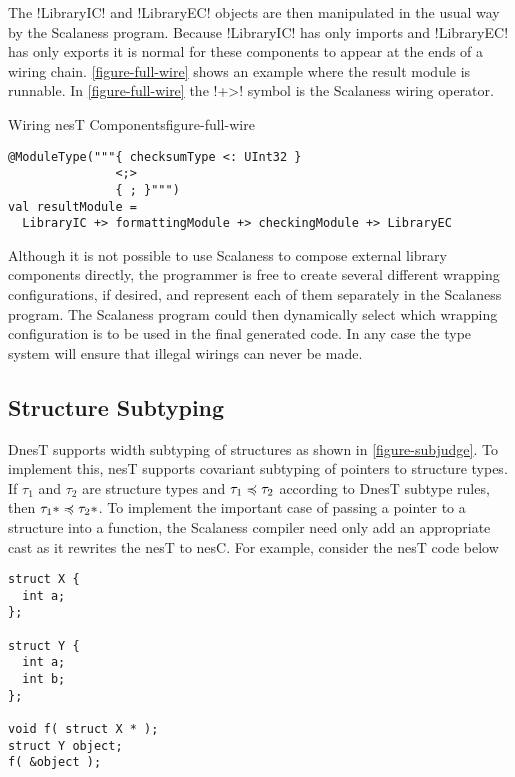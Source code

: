 The !LibraryIC! and !LibraryEC! objects are then manipulated in the usual way by the Scalaness
program. Because !LibraryIC! has only imports and !LibraryEC! has only exports it is normal for
these components to appear at the ends of a wiring chain. \autoref{figure-full-wire} shows an
example where the result module is runnable. In \autoref{figure-full-wire} the !+>! symbol is
the Scalaness wiring operator.

\singlespace
\begin{fpfig}[tbhp]{Wiring nesT Components}{figure-full-wire}
{
\begin{lstlisting}[language=scalaness]
@ModuleType("""{ checksumType <: UInt32 }
               <;>
               { ; }""")
val resultModule =
  LibraryIC +> formattingModule +> checkingModule +> LibraryEC
\end{lstlisting}
}
\end{fpfig}
\primaryspacing

Although it is not possible to use Scalaness to compose external library components directly,
the programmer is free to create several different wrapping configurations, if desired, and
represent each of them separately in the Scalaness program. The Scalaness program could then
dynamically select which wrapping configuration is to be used in the final generated code. In
any case the type system will ensure that illegal wirings can never be made.

\subsection{Structure Subtyping}
\label{section-structure-subtyping}


DnesT supports width subtyping of structures as shown in \autoref{figure-subjudge}. To implement
this, nesT supports covariant subtyping of pointers to structure types. If $\tau_1$ and $\tau_2$
are structure types and $\tau_1 \preccurlyeq \tau_2$ according to DnesT subtype rules, then $\tau_1*
\preccurlyeq \tau_2*$. To implement the important case of passing a pointer to a structure into a
function, the Scalaness compiler need only add an appropriate cast as it rewrites the nesT to
nesC. For example, consider the nesT code below

\singlespace
\vspace{1.0ex}
\begin{lstlisting}[language=nesC]
struct X {
  int a;
};

struct Y {
  int a;
  int b;
};

void f( struct X * );
struct Y object;
f( &object );
\end{lstlisting}
\vspace{1.0ex}
\primaryspacing

